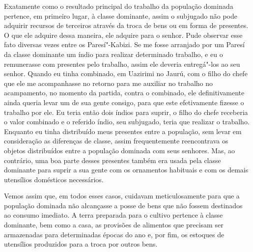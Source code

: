 Exatamente como o resultado principal do trabalho da população dominada
pertence, em primeiro lugar, à classe dominante, assim o subjugado não
pode adquirir recursos de terceiros através da troca de bens ou em forma
de presentes. O que ele adquire dessa maneira, ele adquire para o
senhor. Pude observar esse fato diversas vezes entre os
Paresí"-Kabizi. Se me fosse arranjado por um Paresí da classe dominante
um índio para realizar determinado trabalho, e eu o remunerasse com
presentes pelo trabalho, assim ele deveria entregá"-los ao seu senhor.
Quando eu tinha combinado, em Uazirimi no Jaurú, com o filho do chefe
que ele me acompanhasse no retorno para me auxiliar no trabalho no
acampamento, no momento da partida, contra o combinado, ele
definitivamente ainda queria levar um de sua gente consigo, para que
este efetivamente fizesse o trabalho por ele. Eu teria então dois índios
para suprir, o filho do chefe receberia o valor combinado e o referido
índio, seu subjugado, teria que realizar o trabalho. Enquanto eu tinha
distribuído meus presentes entre a população, sem levar em consideração
as diferenças de classe, assim frequentemente reencontrava os objetos
distribuídos entre a população dominada com seus senhores. Mas, ao
contrário, uma boa parte desses presentes também era usada pela classe
dominante para suprir a sua gente com os ornamentos habituais e com os
demais utensílios domésticos necessários.

Vemos assim que, em todos esses casos, cuidavam meticulosamente para
que a população dominada não alcançasse a posse de bens que não fossem
destinados ao consumo imediato. A terra preparada para o cultivo
pertence à classe dominante, bem como a casa, as provisões
de alimentos que precisam ser armazenadas para determinadas épocas do
ano e, por fim, os estoques de utensílios produzidos para
a troca por outros bens.

